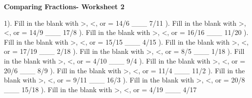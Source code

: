 \documentclass{article}%
\begin{document}
\newline%
\pagebreak%
\large%
\begin{center}%
\textbf{Comparing Fractions- Worksheet 2}%
\newline%
\end{center} \normalsize%
1). Fill in the blank with >, <, or = 14/6 \_\_\_ 7/11%
\newline%
\newline%
). Fill in the blank with >, <, or = 14/9 \_\_\_ 17/8%
\newline%
\newline%
). Fill in the blank with >, <, or = 16/16 \_\_\_ 11/20%
\newline%
\newline%
). Fill in the blank with >, <, or = 15/15 \_\_\_ 4/15%
\newline%
\newline%
). Fill in the blank with >, <, or = 17/19 \_\_\_ 2/18%
\newline%
\newline%
). Fill in the blank with >, <, or = 8/5 \_\_\_ 1/18%
\newline%
\newline%
). Fill in the blank with >, <, or = 4/10 \_\_\_ 9/4%
\newline%
\newline%
). Fill in the blank with >, <, or = 20/6 \_\_\_ 8/9%
\newline%
\newline%
). Fill in the blank with >, <, or = 11/4 \_\_\_ 11/2%
\newline%
\newline%
). Fill in the blank with >, <, or = 9/11 \_\_\_ 16/3%
\newline%
\newline%
). Fill in the blank with >, <, or = 20/8 \_\_\_ 15/18%
\newline%
\newline%
). Fill in the blank with >, <, or = 4/19 \_\_\_ 4/17%
\end{document}
